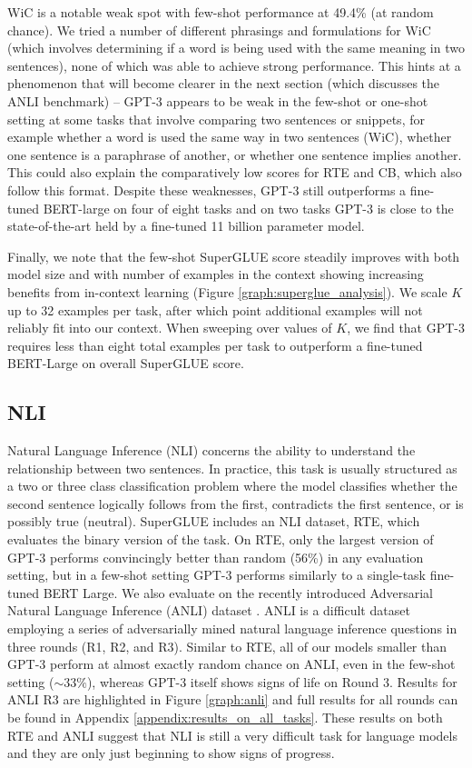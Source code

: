 WiC is a notable weak spot with few-shot performance at 49.4\% (at random chance).  We tried a number of different phrasings and formulations for WiC (which involves determining if a word is being used with the same meaning in two sentences), none of which was able to achieve strong performance.  This hints at a phenomenon that will become clearer in the next section (which discusses the ANLI benchmark) -- GPT-3 appears to be weak in the few-shot or one-shot setting at some tasks that involve comparing two sentences or snippets, for example whether a word is used the same way in two sentences (WiC), whether one sentence is a paraphrase of another, or whether one sentence implies another. This could also explain the comparatively low scores for RTE and CB, which also follow this format. Despite these weaknesses, GPT-3 still outperforms a fine-tuned BERT-large on four of eight tasks and on two tasks GPT-3 is close to the state-of-the-art held by a fine-tuned 11 billion parameter model.

Finally, we note that the few-shot SuperGLUE score steadily improves with both model size and with number of examples in the context showing increasing benefits from in-context learning (Figure \ref{graph:superglue_analysis}). We scale $K$ up to 32 examples per task, after which point additional examples will not reliably fit into our context. When sweeping over values of $K$, we find that GPT-3 requires less than eight total examples per task to outperform a fine-tuned BERT-Large on overall SuperGLUE score.

    \subsection{NLI}
    \label{section:ANLI}

Natural Language Inference (NLI) \cite{fyodorov2000natural} concerns the ability to understand the relationship between two sentences. In practice, this task is usually structured as a two or three class classification problem where the model classifies whether the second sentence logically follows from the first, contradicts the first sentence, or is possibly true (neutral). SuperGLUE includes an NLI dataset, RTE, which evaluates the binary version of the task. On RTE, only the largest version of GPT-3 performs convincingly better than random (56\%) in any evaluation setting, but in a few-shot setting GPT-3 performs similarly to a single-task fine-tuned BERT Large. We also evaluate on the recently introduced Adversarial Natural Language Inference (ANLI) dataset \cite{nie2019adversarial}. ANLI is a difficult dataset employing a series of adversarially mined natural language inference questions in three rounds (R1, R2, and R3). Similar to RTE, all of our models smaller than GPT-3 perform at almost exactly random chance on ANLI, even in the few-shot setting ($\sim33\%$), whereas GPT-3 itself shows signs of life on Round 3. Results for ANLI R3 are highlighted in Figure \ref{graph:anli} and full results for all rounds can be found in Appendix \ref{appendix:results_on_all_tasks}. These results on both RTE and ANLI suggest that NLI is still a very difficult task for language models and they are only just beginning to show signs of progress.

